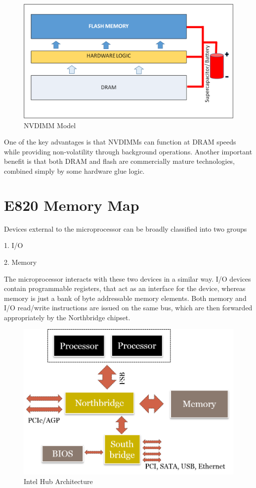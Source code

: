 \begin{figure}[H]
  \centering
  \includegraphics[scale=0.6]{figures/NVDIMM_Stack.png}
  \caption{NVDIMM Model}
  \label{fig:nvdimm}
\end{figure}
One of the key advantages is that NVDIMMs can function at DRAM speeds while providing non-volatility through background operations. Another important benefit is that both DRAM and flash are commercially mature technologies, combined simply by some hardware glue logic. 

\section{E820 Memory Map}



Devices external to the microprocessor can be broadly classified into two groups

1. I/O

2. Memory

The microprocessor interacts with these two devices in a similar way. I/O devices contain programmable registers, that act as an interface for the device, whereas memory is just a bank of byte addressable memory elements. Both memory and I/O read/write instructions are issued on the same bus, which are then forwarded appropriately by the Northbridge chipset. 

\setlength{\belowcaptionskip}{-10pt}

\begin{figure}[H]
  \centering
  \includegraphics[scale=0.6]{figures/intelhubarchi.png}
  \caption{Intel Hub Architecture}
  \label{fig:intel_arch}
\end{figure}

